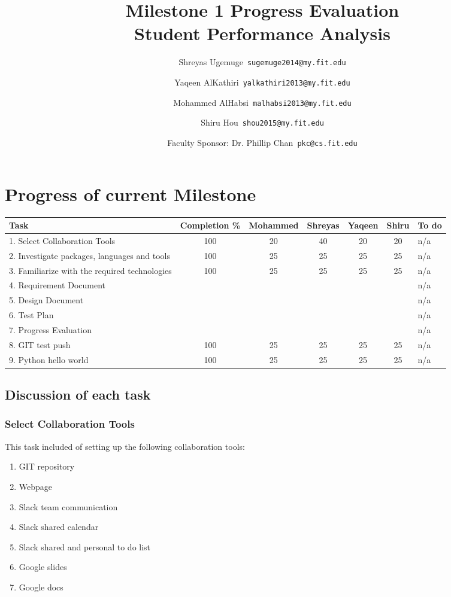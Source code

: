 \documentclass[12pt]{article}
\begin{document}
	\title{\textbf{Milestone 1 Progress Evaluation} \\ \hfill \break
	Student Performance Analysis}
	\author{Shreyas Ugemuge\      \texttt{sugemuge2014@my.fit.edu}
  \and
  Yaqeen AlKathiri\      \texttt{yalkathiri2013@my.fit.edu}
  \and
	Mohammed AlHabsi\      \texttt{malhabsi2013@my.fit.edu}
  \and
  Shiru Hou\      \texttt{shou2015@my.fit.edu}
  \and
  Faculty Sponsor: Dr. Phillip Chan\      \texttt{pkc@cs.fit.edu}}
	\maketitle
	\pagebreak
	\singlespacing
	\tableofcontents
	\pagebreak
	\section{Progress of current Milestone}
	\begin{tabularx}{\textwidth}{|X|c|c|c|c|c|X|}
	\hline
	\textbf{Task} & \textbf{Completion \%} & \textbf{Mohammed} & \textbf{Shreyas} & \textbf{Yaqeen} & \textbf{Shiru} & \textbf{To do} \\ \hline
	1. Select Collaboration Tools & 100 & 20 & 40 & 20 & 20 & n/a \\ \hline
	2. Investigate packages, languages and tools & 100 & 25 & 25 & 25 & 25 & n/a \\ \hline
	3. Familiarize with the required technologies & 100 & 25 & 25 & 25 & 25 & n/a \\ \hline
	4. Requirement Document & & & & & & n/a \\ \hline
	5. Design Document & & & & & & n/a \\ \hline
	6. Test Plan & & & & & & n/a \\ \hline
	7. Progress Evaluation & & & & & & n/a \\ \hline
	8. GIT test push & 100 & 25 & 25 & 25 & 25 & n/a \\ \hline
	9. Python hello world & 100 & 25 & 25 & 25 & 25 & n/a \\ \hline
	\end{tabularx}

	\subsection{Discussion of each task}
	\subsubsection{Select Collaboration Tools}
	This task included of setting up the following collaboration tools:
	\begin{enumerate}
		\item GIT repository
		\item Webpage
		\item Slack team communication
		\item Slack shared calendar
		\item Slack shared and personal to do list
		\item Google slides
		\item Google docs
	\end{enumerate}
\end{document}
